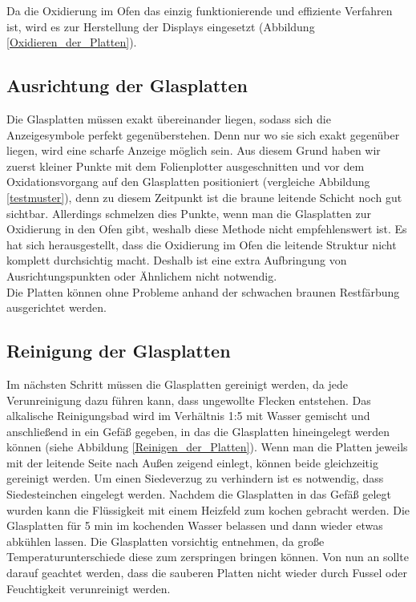 Da die Oxidierung im Ofen das einzig funktionierende und effiziente Verfahren ist, wird es zur Herstellung der Displays eingesetzt (Abbildung \ref{Oxidieren_der_Platten}). 

\subsection{Ausrichtung der Glasplatten}

Die Glasplatten müssen exakt übereinander liegen, sodass sich die Anzeigesymbole perfekt gegenüberstehen. Denn nur wo sie sich exakt gegenüber liegen, wird eine scharfe Anzeige möglich sein.
Aus diesem Grund haben wir zuerst kleiner Punkte mit dem Folienplotter ausgeschnitten und vor dem Oxidationsvorgang auf den Glasplatten positioniert (vergleiche Abbildung \ref{testmuster}), denn zu diesem Zeitpunkt ist die braune leitende Schicht noch gut sichtbar. Allerdings schmelzen dies Punkte, wenn man die Glasplatten zur Oxidierung in den Ofen gibt, weshalb diese Methode nicht empfehlenswert ist.
Es hat sich herausgestellt, dass die Oxidierung im Ofen die leitende Struktur nicht komplett durchsichtig macht. Deshalb ist eine extra Aufbringung von Ausrichtungspunkten oder Ähnlichem nicht notwendig.\\
Die Platten können ohne Probleme anhand der schwachen braunen Restfärbung ausgerichtet werden.

\subsection{Reinigung der Glasplatten}


Im nächsten Schritt müssen die Glasplatten gereinigt werden, da jede Verunreinigung dazu führen kann, dass ungewollte Flecken entstehen.
Das alkalische Reinigungsbad wird im Verhältnis 1:5 mit Wasser gemischt und anschließend in ein Gefäß gegeben, in das die Glasplatten hineingelegt werden können (siehe Abbildung \ref{Reinigen_der_Platten}). Wenn man die Platten jeweils mit der leitende Seite nach Außen zeigend einlegt, können beide gleichzeitig gereinigt werden. Um einen Siedeverzug zu verhindern ist es notwendig, dass Siedesteinchen eingelegt werden. Nachdem die Glasplatten in das Gefäß gelegt wurden kann die Flüssigkeit mit einem Heizfeld zum kochen gebracht werden. Die Glasplatten für 5 min im kochenden Wasser belassen und dann wieder etwas abkühlen lassen. Die Glasplatten vorsichtig entnehmen, da große Temperaturunterschiede diese zum zerspringen bringen können.
Von nun an sollte darauf geachtet werden, dass die sauberen Platten nicht wieder durch Fussel oder Feuchtigkeit verunreinigt werden.

